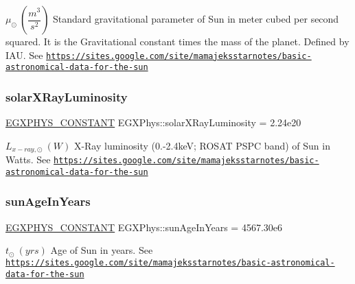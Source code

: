 $ \mu_{\odot} \ (\dfrac{m^3}{s^2})$ Standard gravitational parameter of Sun in meter cubed per second squared. It is the Gravitational constant times the mass of the planet. Defined by I\+AU. See \href{https://sites.google.com/site/mamajeksstarnotes/basic-astronomical-data-for-the-sun}{\tt https\+://sites.\+google.\+com/site/mamajeksstarnotes/basic-\/astronomical-\/data-\/for-\/the-\/sun} \mbox{\label{group___e_g_x_phys-_constants-_astrophysics-_solar_system-_sun-_bulk_ga6d7d3e1d14eb0b8aaba38805a0200ee3}} 
\subsubsection{\texorpdfstring{solar\+X\+Ray\+Luminosity}{solarXRayLuminosity}}
{\footnotesize\ttfamily \mbox{\hyperlink{group___e_g_x_phys-_constants-_macros_ga76980d288494ce1714c9ac68a95ba702}{E\+G\+X\+P\+H\+Y\+S\+\_\+\+C\+O\+N\+S\+T\+A\+NT}} E\+G\+X\+Phys\+::solar\+X\+Ray\+Luminosity = 2.\+24e20}

$L_{x-ray,\odot} \ (W)$ X-\/\+Ray luminosity (0.-\/2.\+4keV; R\+O\+S\+AT P\+S\+PC band) of Sun in Watts. See \href{https://sites.google.com/site/mamajeksstarnotes/basic-astronomical-data-for-the-sun}{\tt https\+://sites.\+google.\+com/site/mamajeksstarnotes/basic-\/astronomical-\/data-\/for-\/the-\/sun} \mbox{\label{group___e_g_x_phys-_constants-_astrophysics-_solar_system-_sun-_bulk_ga940159140fc0eb1f661748d424b26b51}} 
\subsubsection{\texorpdfstring{sun\+Age\+In\+Years}{sunAgeInYears}}
{\footnotesize\ttfamily \mbox{\hyperlink{group___e_g_x_phys-_constants-_macros_ga76980d288494ce1714c9ac68a95ba702}{E\+G\+X\+P\+H\+Y\+S\+\_\+\+C\+O\+N\+S\+T\+A\+NT}} E\+G\+X\+Phys\+::sun\+Age\+In\+Years = 4567.\+30e6}

$t_{\odot} \ (yrs)$ Age of Sun in years. See \href{https://sites.google.com/site/mamajeksstarnotes/basic-astronomical-data-for-the-sun}{\tt https\+://sites.\+google.\+com/site/mamajeksstarnotes/basic-\/astronomical-\/data-\/for-\/the-\/sun} \mbox{\label{group___e_g_x_phys-_constants-_astrophysics-_solar_system-_sun-_bulk_gac72086892d2addbbec944a632c064c95}} 
